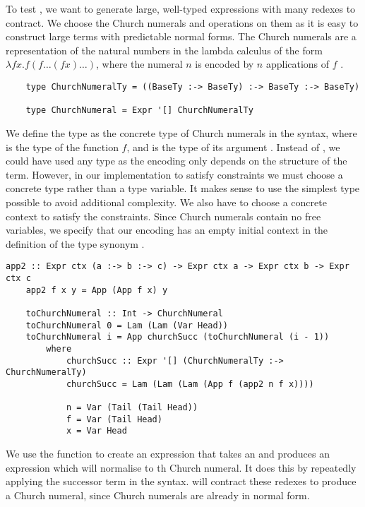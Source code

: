 To test , we want to generate large, well-typed expressions with many redexes to contract. We choose the Church numerals and operations on them as it is easy to construct large terms with predictable normal forms. The Church numerals are a representation of the natural numbers in the lambda calculus of the form $\lambda f x . f (f \dots (f x) \dots)$, where the numeral $n$ is encoded by $n$ applications of $f$ \cite{churchEncodings}.  

\begin{lstlisting}
    type ChurchNumeralTy = ((BaseTy :-> BaseTy) :-> BaseTy :-> BaseTy)

    type ChurchNumeral = Expr '[] ChurchNumeralTy
\end{lstlisting}

We define the type  as the concrete type of Church numerals in the  syntax, where  is the type of the function $f$, and  is the type of its argument . Instead of , we could have used any type as the encoding only depends on the structure of the term. However, in our implementation to satisfy  constraints we must choose a concrete type rather than a type variable. It makes sense to use the simplest type possible to avoid additional complexity. We also have to choose a concrete context to satisfy the  constraints. Since Church numerals contain no free variables, we specify that our encoding has an empty initial context in the definition of the type synonym . 

\begin{lstlisting}[morekeywords={a, b, c}]
    app2 :: Expr ctx (a :-> b :-> c) -> Expr ctx a -> Expr ctx b -> Expr ctx c
    app2 f x y = App (App f x) y 

    toChurchNumeral :: Int -> ChurchNumeral
    toChurchNumeral 0 = Lam (Lam (Var Head))
    toChurchNumeral i = App churchSucc (toChurchNumeral (i - 1)) 
        where
            churchSucc :: Expr '[] (ChurchNumeralTy :-> ChurchNumeralTy)
            churchSucc = Lam (Lam (Lam (App f (app2 n f x))))

            n = Var (Tail (Tail Head))
            f = Var (Tail Head)
            x = Var Head
\end{lstlisting}

We use the  function to create an expression that takes an   and produces an expression which will normalise to th Church numeral. It does this by repeatedly applying the successor term  in the syntax.  will contract these redexes to produce a Church numeral, since Church numerals are already in normal form. 

